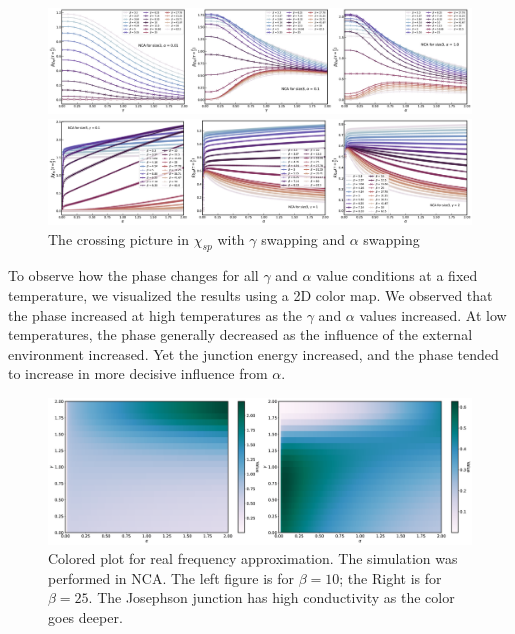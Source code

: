 \documentclass{article}
\begin{document}
\begin{spacing}{1.3}
\begin{figure}[H]
  \centerline{\includegraphics[width=13cm]{TexFigure/4/4_4_01_chi_gam_swp.png}}
  \centerline{\includegraphics[width=13cm]{TexFigure/4/4_4_02_chi_alp_swp.png}}
  \caption{The crossing picture in $\chi_{sp}$ with $\gamma$ swapping and $\alpha$ swapping}
\end{figure}
\pagebreak
To observe how the phase changes for all $\gamma$ and $\alpha$ value conditions at a fixed temperature, 
we visualized the results using a 2D color map.  
We observed that the phase increased at high temperatures as the $\gamma$ and $\alpha$ values increased. 
At low temperatures, the phase generally decreased as the influence of the external environment increased. 
Yet the junction energy increased, and the phase tended to increase in more decisive influence from $\alpha$.
\begin{figure}[H]
  \centerline{\includegraphics[width=13cm]{TexFigure/4/4_4_03_chi_color.png}}
  \caption{Colored plot for real frequency approximation. The simulation was performed in NCA. The left figure is for $\beta=10$; the Right is for $\beta=25$.
  The Josephson junction has high conductivity as the color goes deeper.}
 \end{figure}
\pagebreak

\end{spacing}
\end{document}
